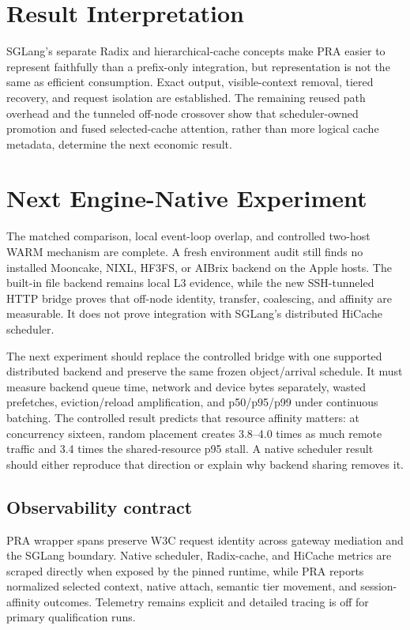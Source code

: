 \documentclass[10pt]{article}
\begin{document}
\section{Result Interpretation}

SGLang's separate Radix and hierarchical-cache concepts make PRA easier to
represent faithfully than a prefix-only integration, but representation is not
the same as efficient consumption. Exact output, visible-context removal,
tiered recovery, and request isolation are established. The remaining reused
path overhead and the tunneled off-node crossover show that scheduler-owned
promotion and fused selected-cache attention, rather than more logical cache
metadata, determine the next economic result.

\section{Next Engine-Native Experiment}
The matched comparison, local event-loop overlap, and controlled two-host WARM
mechanism are complete. A fresh environment audit still finds no installed
Mooncake, NIXL, HF3FS, or AIBrix backend on the Apple hosts. The built-in file
backend remains local L3 evidence, while the new SSH-tunneled HTTP bridge proves
that off-node identity, transfer, coalescing, and affinity are measurable. It
does not prove integration with SGLang's distributed HiCache scheduler.

The next experiment should replace the controlled bridge with one supported
distributed backend and preserve the same frozen object/arrival schedule. It
must measure backend queue time, network and device bytes separately, wasted
prefetches, eviction/reload amplification, and p50/p95/p99 under continuous
batching. The controlled result predicts that resource affinity matters: at
concurrency sixteen, random placement creates 3.8--4.0 times as much remote
traffic and 3.4 times the shared-resource p95 stall. A native scheduler result
should either reproduce that direction or explain why backend sharing removes
it.

\subsection{Observability contract}

PRA wrapper spans preserve W3C request identity across gateway mediation and
the SGLang boundary.  Native scheduler, Radix-cache, and HiCache metrics are
scraped directly when exposed by the pinned runtime, while PRA reports
normalized selected context, native attach, semantic tier movement, and
session-affinity outcomes.  Telemetry remains explicit and detailed tracing is
off for primary qualification runs.
\end{document}
